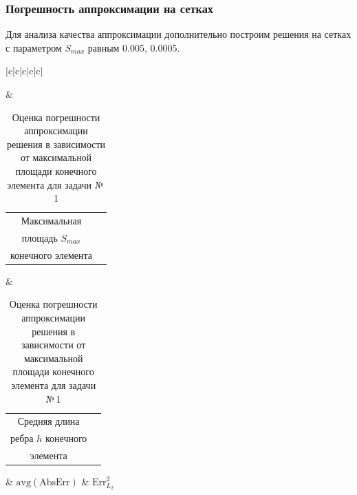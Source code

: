 \documentclass[12pt, a4paper]{article}
\begin{document}
	
	
	
		\newpage
				
		\subsubsection{Погрешность аппроксимации на сетках}
			
			Для анализа качества аппроксимации дополнительно построим решения на сетках с параметром $S_{max}$ равным 0.005, 0.0005. 
			
			\vspace*{-1mm}
			\begin{table}[!h]
				\centering
				\caption{\label{table_comparison} Оценка погрешности аппроксимации решения в зависимости от максимальной площади конечного элемента для задачи №\,1}
				\vspace*{2mm}
				\begin{tabular}{|c|c|c|c|c|}
					
					\hline
					 
					& \begin{tabular}[c]{@{}c@{}c@{}}Максимальная \\ площадь $S_{max}$ \\ конечного элемента \end{tabular}
					& \begin{tabular}[c]{@{}c@{}c@{}}Средняя длина \\ ребра $h$ конечного \\  элемента \end{tabular}
					& $\mathrm{avg}(\mathrm{AbsErr})$
					& $\mathrm{Err}_{L_2}^2$  \\
					

\end{tabular}
\end{table}
\end{document}
